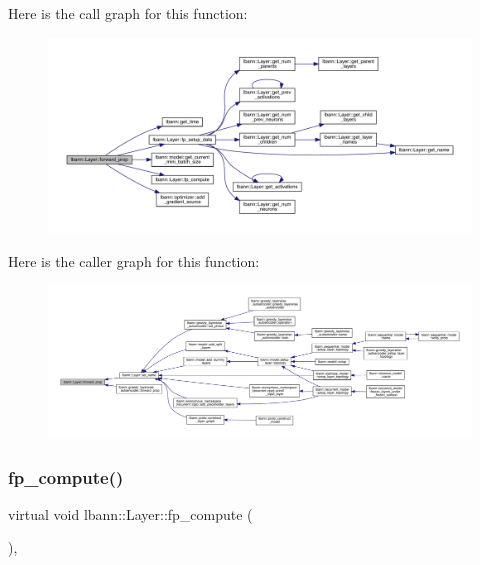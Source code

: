 Here is the call graph for this function\+:\nopagebreak
\begin{figure}[H]
\begin{center}
\leavevmode
\includegraphics[width=350pt]{classlbann_1_1Layer_a2483ccd8a4406a6891f6176f1001b4e5_cgraph}
\end{center}
\end{figure}
Here is the caller graph for this function\+:\nopagebreak
\begin{figure}[H]
\begin{center}
\leavevmode
\includegraphics[width=350pt]{classlbann_1_1Layer_a2483ccd8a4406a6891f6176f1001b4e5_icgraph}
\end{center}
\end{figure}
\mbox{\label{classlbann_1_1Layer_a523319dd1bd87a0612afa1912bb5aad7}} 
\subsubsection{\texorpdfstring{fp\+\_\+compute()}{fp\_compute()}}
{\footnotesize\ttfamily virtual void lbann\+::\+Layer\+::fp\+\_\+compute (\begin{DoxyParamCaption}{ }\end{DoxyParamCaption})\hspace{0.3cm}{\ttfamily [protected]}, {}}

